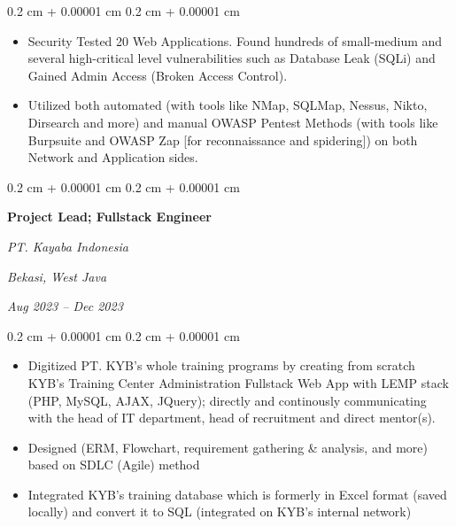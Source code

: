 \documentclass[10pt, letterpaper]{article}
\newenvironment{highlights}{
    \begin{itemize}[
        topsep=0.10 cm,
        parsep=0.10 cm,
        partopsep=0pt,
        itemsep=0pt,
        leftmargin=0.4 cm + 10pt
    ]
}{
    \end{itemize}
} %
\newenvironment{onecolentry}{
    \begin{adjustwidth}{
        0.2 cm + 0.00001 cm
    }{
        0.2 cm + 0.00001 cm
    }
}{
    \end{adjustwidth}
} %
\newenvironment{twocolentry}[2][]{
    \onecolentry
    \def\secondColumn{#2}
    \setcolumnwidth{\fill, 4.5 cm}
    \begin{paracol}{2}
}{
    \switchcolumn \raggedleft \secondColumn
    \end{paracol}
    \endonecolentry
} %
\begin{document}
        \vspace{0.10 cm}
        \begin{onecolentry}
            \begin{highlights}
                \item Security Tested 20 Web Applications. Found hundreds of small-medium and several high-critical level vulnerabilities such as Database Leak (SQLi) and Gained Admin Access (Broken Access Control).
                \item Utilized both automated (with tools like NMap, SQLMap, Nessus, Nikto, Dirsearch and more) and manual OWASP Pentest Methods (with tools like Burpsuite and OWASP Zap [for reconnaissance and spidering]) on both Network and Application sides.
            \end{highlights}
        \end{onecolentry}

        \vspace{0.2 cm}

        \begin{twocolentry}{
        \textit{Bekasi, West Java}    
            
        \textit{Aug 2023 – Dec 2023}}
            \textbf{Project Lead; Fullstack Engineer}
            
            \textit{PT. Kayaba Indonesia}
        \end{twocolentry}

        \vspace{0.10 cm}
        \begin{onecolentry}
            \begin{highlights}
                \item Digitized PT. KYB's whole training programs by creating from scratch KYB's Training Center Administration Fullstack Web App with LEMP stack (PHP, MySQL, AJAX, JQuery); directly and continously communicating with the head of IT department, head of recruitment and direct mentor(s).
                \item Designed (ERM, Flowchart, requirement gathering \& analysis, and more) based on SDLC (Agile) method
                \item Integrated KYB's training database which is formerly in Excel format (saved locally) and convert it to SQL (integrated on KYB's internal network)
            \end{highlights}
        \end{onecolentry}

        \vspace{0.2 cm}
\end{document}
